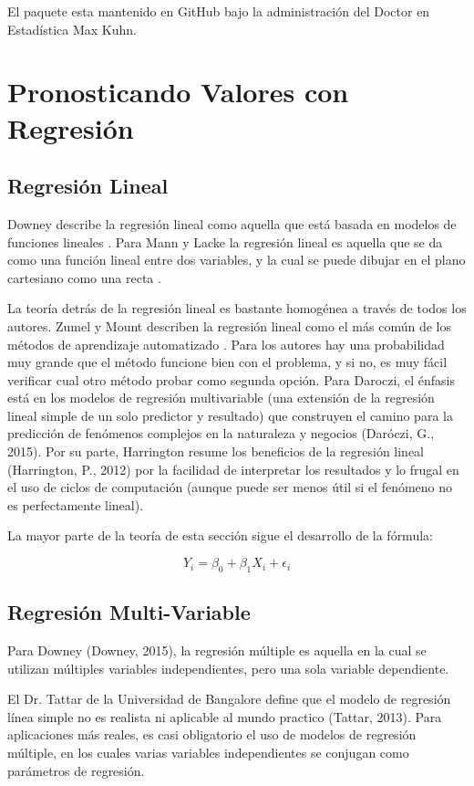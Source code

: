 \documentclass[letterpaper, spanish, 11pt]{report}
\begin{document}
El paquete esta mantenido en GitHub bajo la administración del Doctor en Estadística Max Kuhn. 

\section{Pronosticando Valores con Regresión}

\subsection{Regresión Lineal}
Downey describe la regresión lineal como aquella que está basada en modelos de funciones lineales \cite{thinkStats}. Para Mann y Lacke la regresión lineal es aquella que se da como una función lineal entre dos variables, y la cual se puede dibujar en el plano cartesiano como una recta \cite{intoStats7}. 

La teoría detrás de la regresión lineal es bastante homogénea a través de todos los autores. Zumel y Mount describen la regresión lineal como el más común de los métodos de aprendizaje automatizado \cite{zumelMount}. Para los autores hay una probabilidad muy grande que el método funcione bien con el problema, y si no, es muy fácil verificar cual otro método probar como segunda opción. Para Daroczi, el énfasis está en los modelos de regresión multivariable (una extensión de la regresión lineal simple de un solo predictor y resultado) que construyen el camino para la predicción de fenómenos complejos en la naturaleza y negocios (Daróczi, G., 2015). Por su parte, Harrington resume los beneficios de la regresión lineal (Harrington, P., 2012) por la facilidad de interpretar los resultados y lo frugal en el uso de ciclos de computación (aunque puede ser menos útil si el fenómeno no es perfectamente lineal).

La mayor parte de la teoría de esta sección sigue el desarrollo de la fórmula:

\[Y_{i} = \beta_{0} + \beta_{1}X_{i} + \epsilon_{i}\]

\subsection{Regresión Multi-Variable}
Para Downey (Downey, 2015), la regresión múltiple es aquella en la cual se utilizan múltiples variables independientes, pero una sola variable dependiente. 

El Dr. Tattar de la Universidad de Bangalore define que el modelo de regresión línea simple no es realista ni aplicable al mundo practico (Tattar, 2013). Para aplicaciones más reales, es casi obligatorio el uso de modelos de regresión múltiple, en los cuales varias variables independientes se conjugan como parámetros de regresión. 
\end{document}
